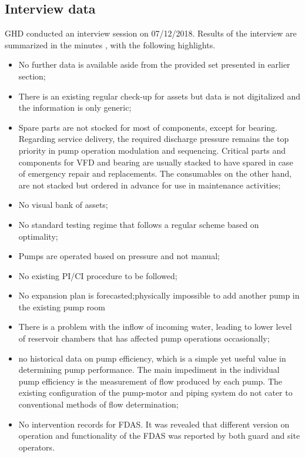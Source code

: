 \subsection{Interview data}
\label{213}
GHD conducted an interview session on 07/12/2018. Results of the interview are summarized in the minutes \cite{GHD2018l}, with the following highlights.

\begin{itemize}
\item No further data is available aside from the provided set presented in earlier section;
\item There is an existing regular check-up for assets but data is not digitalized and the information is only generic;
\item Spare parts are not stocked for most of components, except for bearing. Regarding service delivery, the required discharge pressure remains the top priority in pump operation modulation and sequencing. Critical parts and components for VFD and bearing are usually stacked to have spared in case of emergency repair and replacements. The consumables on the other hand, are not stacked but ordered in advance for use in maintenance activities;
\item No visual bank of assets;
\item No standard testing regime that follows a regular scheme based on optimality;
\item Pumps are operated based on pressure and not manual;
\item No existing PI/CI procedure to be followed;
\item No expansion plan is forecasted;physically impossible to add another pump in the existing pump room
\item There is a problem with the inflow of incoming water, leading to lower level of reservoir chambers that has affected pump operations occasionally;
\item no historical data on pump efficiency, which is a simple yet useful value in determining pump performance. The main impediment in  the individual pump efficiency is the measurement of flow produced by each pump. The existing configuration of the pump-motor and piping system do not cater to conventional methods of flow determination;
\item No intervention records for FDAS. It was revealed that different version on operation and functionality of the FDAS was reported by both guard and site operators.
\end{itemize}

